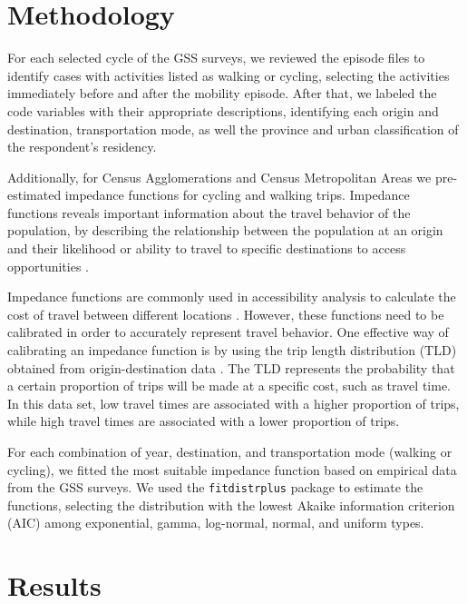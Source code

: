 \documentclass[Royal,times,sageh]{sagej}
\begin{document}
\hypertarget{methodology}{%
\section{Methodology}\label{methodology}}

For each selected cycle of the GSS surveys, we reviewed the episode
files to identify cases with activities listed as walking or cycling,
selecting the activities immediately before and after the mobility
episode. After that, we labeled the code variables with their
appropriate descriptions, identifying each origin and destination,
transportation mode, as well the province and urban classification of
the respondent's residency.

Additionally, for Census Agglomerations and Census Metropolitan Areas we
pre-estimated impedance functions for cycling and walking trips.
Impedance functions reveals important information about the travel
behavior of the population, by describing the relationship between the
population at an origin and their likelihood or ability to travel to
specific destinations to access opportunities \citep{soukhov2024}.

Impedance functions are commonly used in accessibility analysis to
calculate the cost of travel between different locations
\citep{hansen1959, páez2012, palacios2022}. However, these functions
need to be calibrated in order to accurately represent travel behavior.
One effective way of calibrating an impedance function is by using the
trip length distribution (TLD) obtained from origin-destination data
\citep{soukhov2024}. The TLD represents the probability that a certain
proportion of trips will be made at a specific cost, such as travel
time. In this data set, low travel times are associated with a higher
proportion of trips, while high travel times are associated with a lower
proportion of trips.

For each combination of year, destination, and transportation mode
(walking or cycling), we fitted the most suitable impedance function
based on empirical data from the GSS surveys. We used the
\texttt{fitdistrplus} package \citep{mullerdutang2015} to estimate the
functions, selecting the distribution with the lowest Akaike information
criterion (AIC) among exponential, gamma, log-normal, normal, and
uniform types.

\hypertarget{results}{%
\section{Results}\label{results}}
\end{document}
